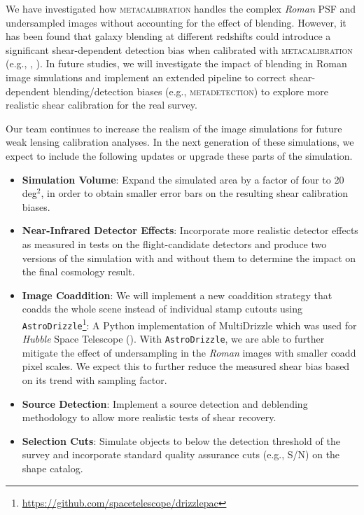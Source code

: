 \documentclass[fleqn,usenatbib]{mnras}
\begin{document}
We have investigated how \textsc{metacalibration} handles the complex \emph{Roman} PSF and undersampled images without accounting for the effect of blending. However, it has been found that galaxy blending at different redshifts could introduce a significant shear-dependent detection bias when calibrated with \textsc{metacalibration} (e.g., \citealt{2020ApJ...902..138S}, \citealt{2020arXiv201208567M}). In future studies, we will investigate the impact of blending in Roman image simulations and implement an extended pipeline to correct shear-dependent blending/detection biases (e.g.,  \textsc{metadetection}) to explore more realistic shear calibration for the real survey. 


Our team continues to increase the realism of the image simulations for future weak lensing calibration analyses. In the next generation of these simulations, we expect to include the following updates or upgrade these parts of the simulation. 
\begin{itemize}
    \setlength\itemsep{1em}
    \item \textbf{Simulation Volume}: Expand the simulated area by a factor of four to 20 deg$^{2}$, in order to obtain smaller error bars on the resulting shear calibration biases. 
    
    \item \textbf{Near-Infrared Detector Effects}: Incorporate more realistic detector effects as measured in tests on the flight-candidate detectors and produce two versions of the simulation with and without them to determine the impact on the final cosmology result.
    
    \item \textbf{Image Coaddition}: We will implement a new coaddition strategy that coadds the whole scene instead of individual stamp cutouts using  \texttt{AstroDrizzle}\footnote{\url{https://github.com/spacetelescope/drizzlepac}}: A Python implementation of MultiDrizzle which was used for \emph{Hubble} Space Telescope (\citealt{2003hstc.conf..325B}). With \texttt{AstroDrizzle}, we are able to further mitigate the effect of undersampling in the \emph{Roman} images with smaller coadd pixel scales. We expect this to further reduce the measured shear bias based on its trend with sampling factor.
    
    \item \textbf{Source Detection}: Implement a source detection and deblending methodology to allow more realistic tests of shear recovery.
    
    \item \textbf{Selection Cuts}: Simulate objects to below the detection threshold of the survey and incorporate standard quality assurance cuts (e.g., S/N) on the shape catalog. 
\end{itemize}
\end{document}
